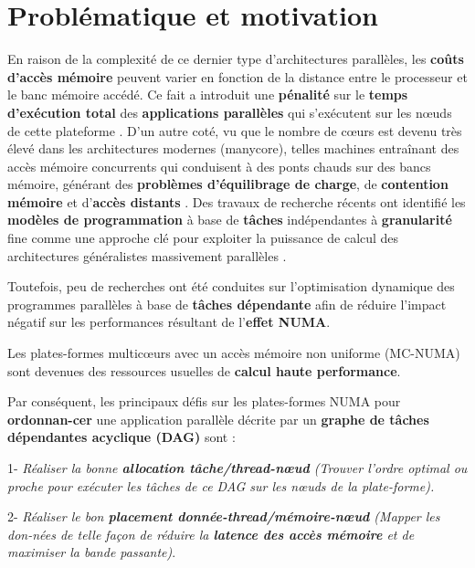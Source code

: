 \section{Problématique et motivation} %
\justify \hspace{\parindent}
En raison de la complexité de ce dernier type d'architectures parallèles, les \textbf{coûts d'accès mémoire} peuvent varier en fonction de la distance entre le processeur et le banc mémoire accédé. 
%
Ce fait a introduit une \textbf{pénalité} sur le \textbf{temps d'exécution total} des \textbf{applications parallèles} qui s'exécutent sur les nœuds de cette plateforme \cite{qaca17}. 
%
D'un autre coté, vu que le nombre de cœurs est devenu très élevé dans les  architectures modernes (manycore), telles machines entraînant des accès mémoire concurrents qui conduisent à des ponts chauds sur des bancs mémoire, générant des \textbf{problèmes d'équilibrage de charge}, de \textbf{contention mémoire} et d'\textbf{accès distants} \cite{qaca17}.   
%
Des travaux de recherche récents ont identifié les \textbf{modèles de programmation} à base de \textbf{tâches} indépendantes à \textbf{granularité} fine comme une approche clé pour exploiter la puissance de calcul des architectures généralistes massivement parallèles \cite{qaca17}. 

\justify \hspace{\parindent}
Toutefois, peu de recherches ont été conduites sur l'optimisation dynamique des programmes parallèles à base de \textbf{tâches dépendante} afin de réduire l'impact négatif sur les performances résultant de l'\textbf{effet NUMA}.

\justify \hspace{\parindent}
Les plates-formes multicœurs avec un accès mémoire non uniforme (MC-NUMA) sont devenues des ressources usuelles de \textbf{calcul haute performance}.

\justify \hspace{\parindent}
Par conséquent, les principaux défis sur les plates-formes NUMA pour \textbf{ordonnan-cer} une application parallèle décrite par un \textbf{graphe de tâches dépendantes acyclique (DAG)} sont :

\justify \hspace{\parindent}
1- \textit{Réaliser la bonne \textbf{allocation tâche/thread-nœud} (Trouver l'ordre optimal ou proche pour exécuter les tâches de ce DAG sur les nœuds de la plate-forme).}

\justify \hspace{\parindent}
2- \textit{Réaliser le bon \textbf{placement donnée-thread/mémoire-nœud} (Mapper les don-nées de telle façon de réduire la \textbf{latence des accès mémoire} et de maximiser la bande passante)}. 

